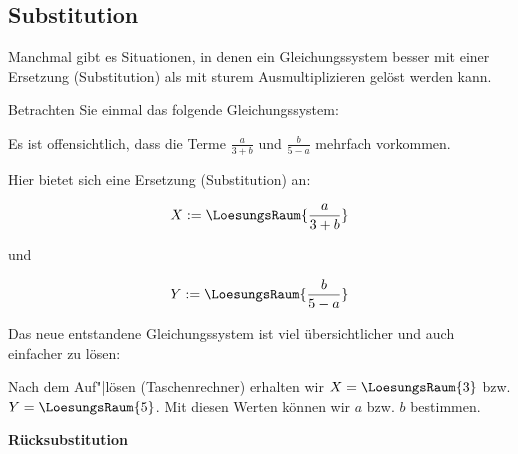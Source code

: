 \subsection{Substitution}
Manchmal gibt es Situationen, in denen ein Gleichungssystem besser mit
einer Ersetzung (Substitution) als mit sturem Ausmultiplizieren gelöst
werden kann.

Betrachten Sie einmal das folgende Gleichungssystem:


Es ist offensichtlich, dass die Terme $\frac{a}{3+b}$ und
$\frac{b}{5-a}$ mehrfach vorkommen.

Hier bietet sich eine Ersetzung (Substitution) an:

$$X := \LoesungsRaum{\frac{a}{3+b}}$$

und

$$Y := \LoesungsRaum{\frac{b}{5-a}}$$

Das neue entstandene Gleichungssystem ist viel übersichtlicher und
auch einfacher zu lösen:


Nach dem Auf"|lösen (\zB Taschenrechner) erhalten wir $X=\LoesungsRaum{3}$ bzw. $Y=\LoesungsRaum{5}$. Mit diesen Werten
können wir $a$ bzw. $b$ bestimmen.
\newpage

\textbf{Rücksubstitution}\,\\

\vspace{1mm}

\newpage



